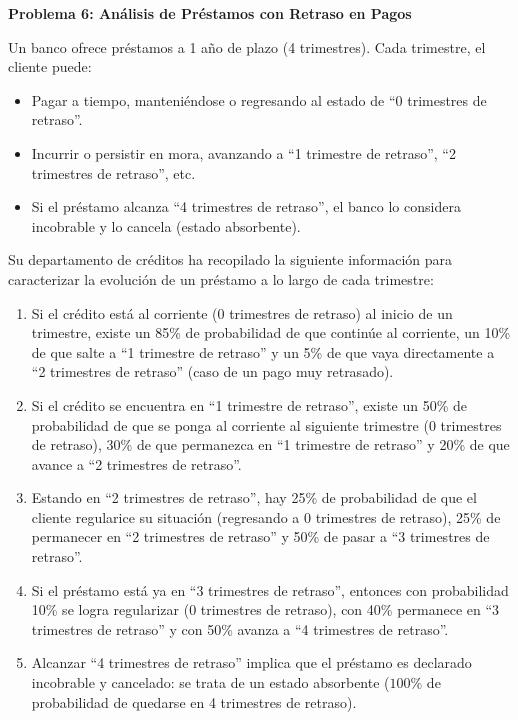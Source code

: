 \documentclass{article}
\begin{document}
\begin{problem}
\textbf{Problema 6: Análisis de Préstamos con Retraso en Pagos }

Un banco ofrece préstamos a 1 año de plazo (4 trimestres). Cada trimestre, el cliente puede:
\begin{itemize}
    \item Pagar a tiempo, manteniéndose o regresando al estado de “0 trimestres de retraso”.
    \item Incurrir o persistir en mora, avanzando a “1 trimestre de retraso”, “2 trimestres de retraso”, etc.
    \item Si el préstamo alcanza “4 trimestres de retraso”, el banco lo considera incobrable y lo cancela (estado absorbente).
\end{itemize}

Su departamento de créditos ha recopilado la siguiente información para caracterizar la evolución de un préstamo a lo largo de cada trimestre:
\begin{enumerate}
    \item Si el crédito está al corriente (0 trimestres de retraso) al inicio de un trimestre, existe un 85\% de probabilidad de que continúe al corriente, un 10\% de que salte a “1 trimestre de retraso” y un 5\% de que vaya directamente a “2 trimestres de retraso” (caso de un pago muy retrasado).
    \item Si el crédito se encuentra en “1 trimestre de retraso”, existe un 50\% de probabilidad de que se ponga al corriente al siguiente trimestre (0 trimestres de retraso), 30\% de que permanezca en “1 trimestre de retraso” y 20\% de que avance a “2 trimestres de retraso”.
    \item Estando en “2 trimestres de retraso”, hay 25\% de probabilidad de que el cliente regularice su situación (regresando a 0 trimestres de retraso), 25\% de permanecer en “2 trimestres de retraso” y 50\% de pasar a “3 trimestres de retraso”.
    \item Si el préstamo está ya en “3 trimestres de retraso”, entonces con probabilidad 10\% se logra regularizar (0 trimestres de retraso), con 40\% permanece en “3 trimestres de retraso” y con 50\% avanza a “4 trimestres de retraso”.
    \item Alcanzar “4 trimestres de retraso” implica que el préstamo es declarado incobrable y cancelado: se trata de un estado absorbente (\(100\%\) de probabilidad de quedarse en 4 trimestres de retraso).
\end{enumerate}


\end{problem}
\end{document}
